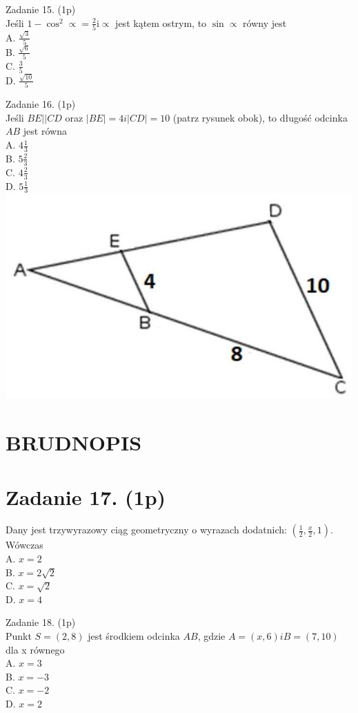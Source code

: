 \documentclass[10pt]{article}
\begin{document}
Zadanie 15. (1p)\\
Jeśli \(1-\cos ^{2} \propto=\frac{2}{5} \mathrm{i} \propto\) jest kątem ostrym, to \(\sin \propto\) równy jest\\
A. \(\frac{\sqrt{3}}{5}\)\\
B. \(\frac{\sqrt{6}}{5}\)\\
C. \(\frac{3}{5}\)\\
D. \(\frac{\sqrt{10}}{5}\)

Zadanie 16. (1p)\\
Jeśli \(B E|\mid C D\) oraz \(| B E|=4 i| C D \mid=10\) (patrz rysunek obok), to długość odcinka \(A B\) jest równa\\
A. \(4 \frac{1}{3}\)\\
B. \(5 \frac{2}{3}\)\\
C. \(4 \frac{2}{3}\)\\
D. \(5 \frac{1}{3}\)\\
\includegraphics[max width=\textwidth, center]{2024_11_21_eef8bdc8380ba249dbe1g-04}

\section*{BRUDNOPIS}
\section*{Zadanie 17. (1p)}
Dany jest trzywyrazowy ciąg geometryczny o wyrazach dodatnich: \(\left(\frac{1}{2}, \frac{x}{2}, 1\right)\). Wówczas\\
A. \(x=2\)\\
B. \(x=2 \sqrt{2}\)\\
C. \(x=\sqrt{2}\)\\
D. \(x=4\)

Zadanie 18. (1p)\\
Punkt \(S=(2,8)\) jest środkiem odcinka \(A B\), gdzie \(A=(x, 6) i B=(7,10)\) dla x równego\\
A. \(x=3\)\\
B. \(x=-3\)\\
C. \(x=-2\)\\
D. \(x=2\)
\end{document}
